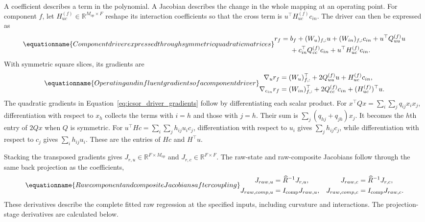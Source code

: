 A coefficient describes a term in the polynomial. A Jacobian describes the change in the whole mapping at an operating point. For component \(f\), let \(H_{uc}^{(f)}\in\mathbb{R}^{M_{op}\times F}\) reshape its interaction coefficients so that the cross term is \(u^\top H_{uc}^{(f)}c_{in}\). The driver can then be expressed as
\begin{equation}
\equationname{Component driver expressed through symmetric quadratic matrices}
\label{eq:icsor_driver_component}
\begin{aligned}
r_f={}&b_f+(W_u)_{f,:}u+(W_{in})_{f,:}c_{in}
+u^\top Q_{uu}^{(f)}u\\
&+c_{in}^\top Q_{cc}^{(f)}c_{in}
+u^\top H_{uc}^{(f)}c_{in}.
\end{aligned}
\end{equation}
With symmetric square slices, its gradients are
\begin{equation}
\equationname{Operating and influent gradients of a component driver}
\label{eq:icsor_driver_gradients}
\begin{aligned}
\nabla_u r_f&=(W_u)_{f,:}^\top+2Q_{uu}^{(f)}u
+H_{uc}^{(f)}c_{in},\\
\nabla_{c_{in}}r_f&=(W_{in})_{f,:}^\top+2Q_{cc}^{(f)}c_{in}
+(H_{uc}^{(f)})^\top u.
\end{aligned}
\end{equation}
The quadratic gradients in Equation~\eqref{eq:icsor_driver_gradients} follow by differentiating each scalar product. For \(x^\top Qx=\sum_i\sum_jq_{ij}x_ix_j\), differentiation with respect to \(x_h\) collects the terms with \(i=h\) and those with \(j=h\). Their sum is \(\sum_j(q_{hj}+q_{jh})x_j\). It becomes the \(h\)th entry of \(2Qx\) when \(Q\) is symmetric. For \(u^\top Hc=\sum_i\sum_jh_{ij}u_ic_j\), differentiation with respect to \(u_i\) gives \(\sum_jh_{ij}c_j\), while differentiation with respect to \(c_j\) gives \(\sum_i h_{ij}u_i\). These are the entries of \(Hc\) and \(H^\top u\).

Stacking the transposed gradients gives \(J_{r,u}\in\mathbb{R}^{F\times M_{op}}\) and \(J_{r,c}\in\mathbb{R}^{F\times F}\). The raw-state and raw-composite Jacobians follow through the same back projection as the coefficients,
\begin{equation}
\equationname{Raw component and composite Jacobians after coupling}
\label{eq:icsor_raw_jacobians}
\begin{aligned}
J_{raw,u}&=\widehat R^{-1}J_{r,u},
&J_{raw,c}&=\widehat R^{-1}J_{r,c},\\
J_{raw,comp,u}&=I_{\mathrm{comp}}J_{raw,u},
&J_{raw,comp,c}&=I_{\mathrm{comp}}J_{raw,c}.
\end{aligned}
\end{equation}
These derivatives describe the complete fitted raw regression at the specified inputs, including curvature and interactions. The projection-stage derivatives are calculated below.

